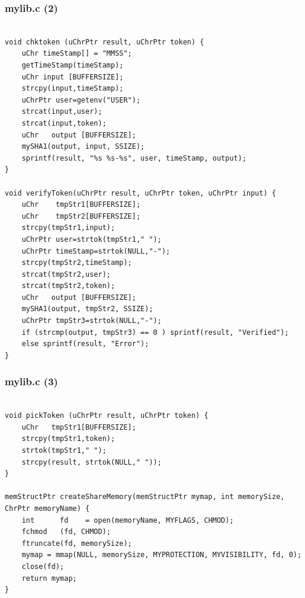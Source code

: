 \documentclass[aspectratio=169, xcolor=table, notheorems, hyperref={pdfpagelabels=false}]{beamer}
\begin{document}
\begin{frame}[fragile]
\frametitle{mylib.c (2)}
\begin{lstlisting}[basicstyle=\ttfamily\tiny]         % 108

void chktoken (uChrPtr result, uChrPtr token) {
    uChr timeStamp[] = "MMSS";
    getTimeStamp(timeStamp);
    uChr input [BUFFERSIZE];
    strcpy(input,timeStamp);
    uChrPtr user=getenv("USER");
    strcat(input,user);
    strcat(input,token);
    uChr   output [BUFFERSIZE];
    mySHA1(output, input, SSIZE);
    sprintf(result, "%s %s-%s", user, timeStamp, output);
}

void verifyToken(uChrPtr result, uChrPtr token, uChrPtr input) {
    uChr    tmpStr1[BUFFERSIZE];
    uChr    tmpStr2[BUFFERSIZE];
    strcpy(tmpStr1,input);
    uChrPtr user=strtok(tmpStr1," ");
    uChrPtr timeStamp=strtok(NULL,"-");
    strcpy(tmpStr2,timeStamp);
    strcat(tmpStr2,user);
    strcat(tmpStr2,token);
    uChr   output [BUFFERSIZE];
    mySHA1(output, tmpStr2, SSIZE);
    uChrPtr tmpStr3=strtok(NULL,"-");
    if (strcmp(output, tmpStr3) == 0 ) sprintf(result, "Verified");
    else sprintf(result, "Error");
}

\end{lstlisting}
\end{frame}

\begin{frame}[fragile]
\frametitle{mylib.c (3)}
\begin{lstlisting}[basicstyle=\ttfamily\tiny]         % 108

void pickToken (uChrPtr result, uChrPtr token) {
    uChr   tmpStr1[BUFFERSIZE];
    strcpy(tmpStr1,token);
    strtok(tmpStr1," ");
    strcpy(result, strtok(NULL," "));
}

memStructPtr createShareMemory(memStructPtr mymap, int memorySize, ChrPtr memoryName) {
    int      fd    = open(memoryName, MYFLAGS, CHMOD);
    fchmod   (fd, CHMOD);
    ftruncate(fd, memorySize);
    mymap = mmap(NULL, memorySize, MYPROTECTION, MYVISIBILITY, fd, 0);
    close(fd);
    return mymap;
}

\end{lstlisting}
\end{frame}
\end{document}
